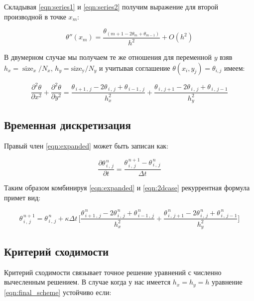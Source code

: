 \documentclass[a4paper]{extarticle}
\begin{document}
Складывая \eqref{eqn:series1} и \eqref{eqn:series2} получим выражение для второй производной в точке $x_m$:

\begin{equation}
\theta''(x_m) = \frac{\theta_{\left(m+1 - 2\theta_m + \theta_{m-1}\right)}}{h^2} + O(h^2)
\end{equation}

В двумерном случае мы получаем те же отношения для переменной $y$ взяв $h_x = \operatorname{size}_x/N_x$, $h_y = \operatorname{size_y}/N_y$ и учитывая соглашение $\theta(x_i,y_j) = \theta_{i,j}$ имеем:

\begin{equation}
\label{eqn:2dcase}
\frac{\partial^{2}\theta}{\partial x^{2}}+\frac{\partial^{2}\theta}{\partial y^{2}}=\frac{\theta_{\,i+1\,,\,j}-2\theta_{\,i\,,\,j}+\theta_{\,i-1\,,\,j}}{h_{x}^{2}}+\frac{\theta_{\,i\,,\,j+1}-2\theta_{\,i\,,\,j}+\theta_{\,i\,,\,j-1}}{h_{y}^{2}}
\end{equation}

\subsection{Временная дискретизация}

Правый член \eqref{eqn:expanded} может быть записан как:

\begin{equation}
\frac{\partial \theta_{\,i\,,\,j}^{\,n}}{\partial t}=\frac{\theta_{\,i\,,\,j}^{\,n+1}-\theta_{\,i\,,\,j}^{\,n}}{\Delta t}
\end{equation}

Таким образом комбинируя \eqref{eqn:expanded} и \eqref{eqn:2dcase} рекуррентная формула примет вид:

\begin{equation}
\label{eqn:final_scheme}
\theta_{\,i\,,\,j}^{\,n+1}=\theta_{\,i\,,\,j}^{\,n}+\kappa \Delta t\,\bigg[\dfrac{\theta_{\,i+1\,,\,j}^{\,n}-2\theta_{\,i\,,\,j}^{\,n}+
	\theta_{\,i-1\,,\,j}^{\,n}}{h_{x}^{2}}+\dfrac{\theta_{\,i\,,\,j+1}^{\,n}-2\theta_{\,i\,,\,j}^{\,n}+\theta_{\,i\,,\,j-1}^{\,n}}{h_{y}^{2}}\bigg]
\end{equation}

\subsection{Критерий сходимости}

Критерий сходимости связывает точное решение уравнений с численно вычесленным решением. В случае когда у нас имеется  $h_x = h_y = h$ уравнение \eqref{eqn:final_scheme} устойчиво если:
\end{document}
